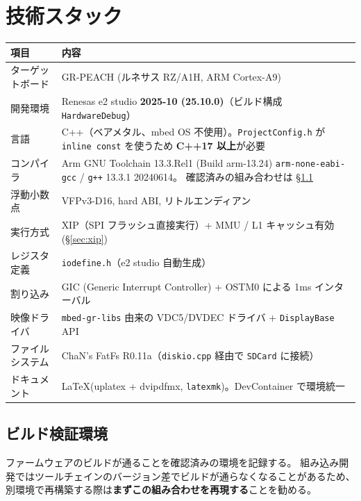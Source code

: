\documentclass[a4paper,11pt,dvipdfmx]{jsarticle}
\newcommand{\ideversion}{2025-10 (25.10.0)}
\newcommand{\gccbuild}{Arm GNU Toolchain 13.3.Rel1 (Build arm-13.24)}
\newcommand{\gccversion}{13.3.1 20240614}
\begin{document}
\section{技術スタック}\label{sec:techstack}

\begin{tabularx}{\textwidth}{l X}
\toprule
\textbf{項目} & \textbf{内容} \\
\midrule
ターゲットボード & GR-PEACH (ルネサス RZ/A1H, ARM Cortex-A9) \\
開発環境         & Renesas e2 studio \textbf{\ideversion}（ビルド構成 \texttt{HardwareDebug}） \\
言語             & C++（ベアメタル、mbed OS 不使用）。\texttt{ProjectConfig.h} が
                   \texttt{inline const} を使うため \textbf{C++17 以上}が必要 \\
コンパイラ       & \gccbuild \newline
                   \texttt{arm-none-eabi-gcc} / \texttt{g++} \gccversion。
                   確認済みの組み合わせは \hyperref[sec:buildenv]{§\ref*{sec:buildenv}} \\
浮動小数点       & VFPv3-D16, hard ABI, リトルエンディアン \\
実行方式         & XIP（SPI フラッシュ直接実行）+ MMU / L1 キャッシュ有効
                   (\hyperref[sec:xip]{§\ref*{sec:xip}}) \\
レジスタ定義     & \texttt{iodefine.h}（e2 studio 自動生成） \\
割り込み         & GIC (Generic Interrupt Controller) + OSTM0 による 1ms インターバル \\
映像ドライバ     & \texttt{mbed-gr-libs} 由来の VDC5/DVDEC ドライバ + \texttt{DisplayBase} API \\
ファイルシステム & ChaN's FatFs R0.11a（\texttt{diskio.cpp} 経由で \texttt{SDCard} に接続） \\
ドキュメント     & \LaTeX (uplatex + dvipdfmx, \texttt{latexmk})。DevContainer で環境統一 \\
\bottomrule
\end{tabularx}

\subsection{ビルド検証環境}\label{sec:buildenv}

ファームウェアのビルドが通ることを確認済みの環境を記録する。
組み込み開発ではツールチェインのバージョン差でビルドが通らなくなることがあるため、
別環境で再構築する際は\textbf{まずこの組み合わせを再現する}ことを勧める。
\end{document}
